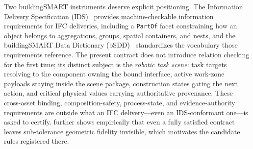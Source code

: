 Two buildingSMART instruments deserve explicit positioning. The Information
Delivery Specification (IDS)~\cite{bsi_ids} provides machine-checkable
information requirements for IFC deliveries, including a \texttt{PartOf}
facet constraining how an object belongs to aggregations, groups, spatial
containers, and nests, and the buildingSMART Data Dictionary
(bSDD)~\cite{bsi_bsdd} standardizes the vocabulary those requirements
reference. The present contract does not introduce relation checking for the
first time; its distinct subject is the \emph{robotic task scene}: task
targets resolving to the component owning the bound interface, active
work-zone payloads staying inside the scene package, construction states
gating the next action, and critical physical values carrying authoritative
provenance. These cross-asset binding, composition-safety, process-state,
and evidence-authority requirements are outside what an IFC delivery---even
an IDS-conformant one---is asked to certify.  further
shows empirically that even a fully satisfied contract leaves sub-tolerance
geometric fidelity invisible, which motivates the candidate rules registered
there.

